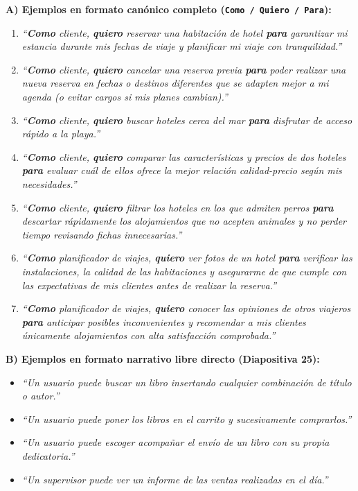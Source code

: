 \begin{ejemplo}
\textbf{A) Ejemplos en formato canónico completo (\texttt{Como / Quiero / Para}):}
\begin{enumerate}[label=\textbf{\arabic*.}, itemsep=3pt]
    \item \textit{``\textbf{Como} cliente, \textbf{quiero} reservar una habitación de hotel \textbf{para} garantizar mi estancia durante mis fechas de viaje y planificar mi viaje con tranquilidad.''}
    \item \textit{``\textbf{Como} cliente, \textbf{quiero} cancelar una reserva previa \textbf{para} poder realizar una nueva reserva en fechas o destinos diferentes que se adapten mejor a mi agenda (o evitar cargos si mis planes cambian).''}
    \item \textit{``\textbf{Como} cliente, \textbf{quiero} buscar hoteles cerca del mar \textbf{para} disfrutar de acceso rápido a la playa.''}
    \item \textit{``\textbf{Como} cliente, \textbf{quiero} comparar las características y precios de dos hoteles \textbf{para} evaluar cuál de ellos ofrece la mejor relación calidad-precio según mis necesidades.''}
    \item \textit{``\textbf{Como} cliente, \textbf{quiero} filtrar los hoteles en los que admiten perros \textbf{para} descartar rápidamente los alojamientos que no acepten animales y no perder tiempo revisando fichas innecesarias.''}
    \item \textit{``\textbf{Como} planificador de viajes, \textbf{quiero} ver fotos de un hotel \textbf{para} verificar las instalaciones, la calidad de las habitaciones y asegurarme de que cumple con las expectativas de mis clientes antes de realizar la reserva.''}
    \item \textit{``\textbf{Como} planificador de viajes, \textbf{quiero} conocer las opiniones de otros viajeros \textbf{para} anticipar posibles inconvenientes y recomendar a mis clientes únicamente alojamientos con alta satisfacción comprobada.''}
\end{enumerate}

\textbf{B) Ejemplos en formato narrativo libre directo (Diapositiva 25):}
\begin{itemize}[itemsep=2pt]
    \item \textit{``Un usuario puede buscar un libro insertando cualquier combinación de título o autor.''}
    \item \textit{``Un usuario puede poner los libros en el carrito y sucesivamente comprarlos.''}
    \item \textit{``Un usuario puede escoger acompañar el envío de un libro con su propia dedicatoria.''}
    \item \textit{``Un supervisor puede ver un informe de las ventas realizadas en el día.''}
\end{itemize}
\end{ejemplo}
